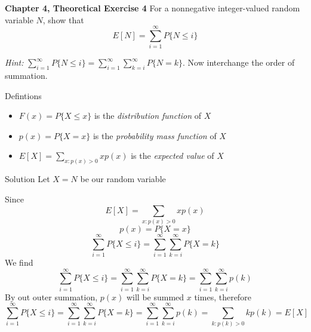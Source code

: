 \documentclass{article}
\begin{document}
\begin{spacing}{1.1}
\maketitle

\newpage
\begin{homeworkProblem}
  {\bf Chapter 4, Theoretical Exercise 4}
  For a nonnegative integer-valued random variable $N$, show that
  \[E[ N] = \sum\limits_{i = 1}^{\infty}{ P\{ N \le i\}}\]

  \emph{Hint:} $\sum\limits_{i = 1}^{\infty}{ P\{ N \le i\}} 
  = \sum\limits_{i = 1}^{ \infty}{ \sum\limits_{k = i}^{\infty}{P\{ N = k\}}}$.
  Now interchange the order of summation.
  \begin{homeworkSection}{Defintions}
    \begin{itemize}
      \item $F( x) = P\{ X \le x\}$ is the \emph{distribution function} of $X$
      \item $p( x) = P\{ X = x\}$ is the \emph{probability mass function} of $X$
      \item $E[ X] = \sum\limits_{x:p( x) > 0}{ x p( x)}$ is the 
      \emph{expected value} of $X$
    \end{itemize}
  \end{homeworkSection}
  \begin{homeworkSection}{Solution}
    Let $X = N$ be our random variable

    Since 
    \[E[ X] = \sum\limits_{x:p( x) > 0}{ x p( x)}\]
    \[p( x) = P\{ X = x\}\]
    \[\sum\limits_{i = 1}^{\infty}{ P\{ X \le i\}} 
    = \sum\limits_{i = 1}^{ \infty}{ \sum\limits_{k = i}^{\infty}{P\{ X = k\}}}\]
    We find 
    \[\sum\limits_{i = 1}^{\infty}{ P\{ X \le i\}} 
    = \sum\limits_{i = 1}^{ \infty}{ \sum\limits_{k = i}^{\infty}{P\{ X = k\}}}
    = \sum\limits_{i = 1}^{ \infty}{ \sum\limits_{k = i}^{\infty}{ p( k)}}\]
    By out outer summation, $p( x)$ will be summed $x$ times, therefore
    \[\sum\limits_{i = 1}^{\infty}{ P\{ X \le i\}} 
    = \sum\limits_{i = 1}^{ \infty}{ \sum\limits_{k = i}^{\infty}{P\{ X = k\}}}
    = \sum\limits_{i = 1}^{ \infty}{ \sum\limits_{k = i}^{\infty}{ p( k)}}
    = \sum\limits_{k:p( k) > 0}{ k p( k)} = E[ X]\]


\end{homeworkSection}
\end{homeworkProblem}
\end{spacing}
\end{document}
